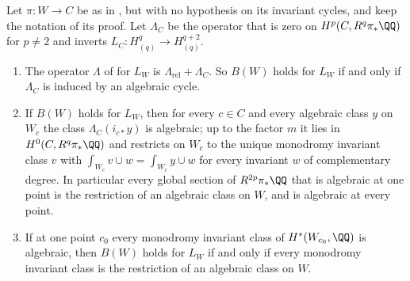 \begin{theorem}\label{thm:lefschetzpropagation}
Let $\pi\colon W\to C$ be as in , but with no
hypothesis on its invariant cycles, and keep the notation of its proof. Let
$\Lambda_{C}$ be the operator that is zero on $H^{p}(C,R^{q}\pi_{*}\QQ)$ for
$p\ne2$ and inverts $L_{C}\colon H^{q}_{(q)}\to H^{q+2}_{(q)}$.
\begin{enumerate}[label=\textup{(\roman*)},leftmargin=2.6em,itemsep=2pt]
\item The operator $\Lambda$ of  for $L_{W}$ is
  $\Lambda_{\mathrm{rel}}+\Lambda_{C}$. So $B(W)$ holds for $L_{W}$ if and
  only if $\Lambda_{C}$ is induced by an algebraic cycle.
\item If $B(W)$ holds for $L_{W}$, then for every $c\in C$ and every algebraic
  class $y$ on $W_{c}$ the class $\Lambda_{C}(i_{c*}y)$ is algebraic; up to
  the factor $m$ it lies in $H^{0}(C,R^{q}\pi_{*}\QQ)$ and restricts on
  $W_{c}$ to the unique monodromy invariant class $v$ with
  $\int_{W_{c}}v\cup w=\int_{W_{c}}y\cup w$ for every invariant $w$ of
  complementary degree. In particular every global section of
  $R^{2p}\pi_{*}\QQ$ that is algebraic at one point is the restriction of an
  algebraic class on $W$, and is algebraic at every point.
\item If at one point $c_{0}$ every monodromy invariant class of
  $H^{*}(W_{c_{0}},\QQ)$ is algebraic, then $B(W)$ holds for $L_{W}$ if and
  only if every monodromy invariant class is the restriction of an algebraic
  class on $W$.
\end{enumerate}
\end{theorem}

